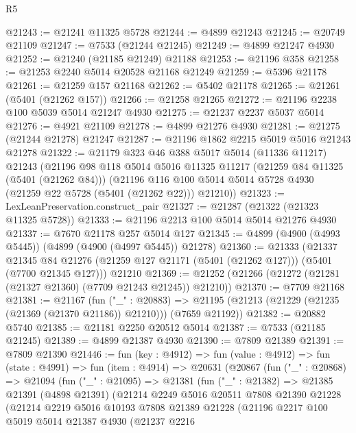 \begin{lexlean}{R5}
\begin{coremodule}
@21243 := @21241 @11325 @5728
@21244 := @4899 @21243
@21245 := @20749 @21109
@21247 := @7533 (@21244 @21245)
@21249 := @4899 @21247 @4930
@21252 := @21240 (@21185 @21249) @21188
@21253 := @21196 @358
@21258 := @21253 @2240 @5014 @20528 @21168 @21249
@21259 := @5396 @21178
@21261 := @21259 @157 @21168
@21262 := @5402 @21178
@21265 := @21261 (@5401 (@21262 @157))
@21266 := @21258 @21265
@21272 := @21196 @2238 @100 @5039 @5014 @21247 @4930
@21275 := @21237 @2237 @5037 @5014
@21276 := @4921 @21109
@21278 := @4899 @21276 @4930
@21281 := @21275 (@21244 @21278) @21247
@21287 := @21196 @1862 @2215 @5019 @5016 @21243 @21278
@21322 := @21179
    @323
    @46
    @388
    @5017
    @5014
    (@11336 @11217)
    @21243
    (@21196
      @98
      @118
      @5014
      @5016
      @11325
      @11217
      (@21259 @84 @11325 (@5401 (@21262 @84)))
      (@21196 @116 @100 @5014 @5014 @5728 @4930 (@21259 @22 @5728 (@5401 (@21262 @22))) @21210))
@21323 := LexLeanPreservation.construct_pair
@21327 := @21287 (@21322 (@21323 @11325 @5728))
@21333 := @21196 @2213 @100 @5014 @5014 @21276 @4930
@21337 := @7670 @21178 @257 @5014 @127
@21345 := @4899 (@4900 (@4993 @5445)) (@4899 (@4900 (@4997 @5445)) @21278)
@21360 := @21333
    (@21337
      @21345
      @84
      @21276
      (@21259 @127 @21171 (@5401 (@21262 @127)))
      (@5401 (@7700 @21345 @127)))
    @21210
@21369 := @21252 (@21266 (@21272 (@21281 (@21327 @21360) (@7709 @21243 @21245)) @21210))
@21370 := @7709 @21168
@21381 := @21167
    (fun ("_" : @20883) =>
    @21195 (@21213 (@21229 (@21235 (@21369 (@21370 @21186)) @21210))) (@7659 @21192))
@21382 := @20882 @5740
@21385 := @21181 @2250 @20512 @5014
@21387 := @7533 (@21185 @21245)
@21389 := @4899 @21387 @4930
@21390 := @7809 @21389
@21391 := @7809 @21390
@21446 := fun (key : @4912) =>
  fun (value : @4912) =>
  fun (state : @4991) =>
  fun (item : @4914) =>
  @20631
    (@20867
      (fun ("_" : @20868) =>
      @21094
        (fun ("_" : @21095) =>
        @21381
          (fun ("_" : @21382) =>
          @21385
            @21391
            (@4898 @21391)
            (@21214
              @2249
              @5016
              @20511
              @7808
              @21390
              @21228
              (@21214
                @2219
                @5016
                @10193
                @7808
                @21389
                @21228
                (@21196
                  @2217
                  @100
                  @5019
                  @5014
                  @21387
                  @4930
                  (@21237
                    @2216

\end{coremodule}
\end{lexlean}
